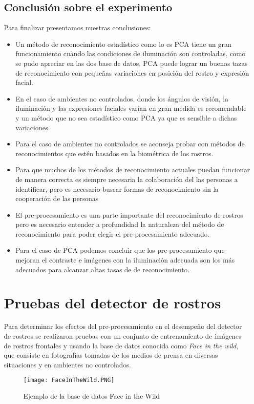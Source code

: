 \subsection{Conclusión sobre el experimento}
Para finalizar presentamos nuestras conclusiones:
\begin{itemize}
\item Un método de reconocimiento estadístico como lo es \ac{PCA} tiene un gran funcionamiento cuando las condiciones de iluminación son controladas, como se pudo apreciar en las dos base de datos, \ac{PCA} puede lograr un buenas tazas de reconocimiento con pequeñas variaciones en posición del rostro y expresión facial.
\item En el caso de ambientes no controlados, donde los ángulos de visión, la iluminación y las expresiones faciales varían en gran medida es recomendable y un método que no sea estadístico como \ac{PCA} ya que es sensible a dichas variaciones.
\item Para el caso de ambientes no controlados se aconseja probar con métodos de reconocimientos que estén basados en la biométrica de los rostros.
\item Para que muchos de los métodos de  reconocimiento actuales  puedan funcionar de manera correcta es siempre necesaria la colaboración del las personas a identificar, pero es necesario buscar formas de reconocimiento sin la cooperación de las personas
\item El pre-procesamiento es una parte importante del reconocimiento de rostros pero es necesario entender a profundidad la naturaleza del método de reconocimiento para poder elegir el pre-procesamiento adecuado.
\item Para el caso de \ac{PCA} podemos concluir que los pre-procesamiento que mejoran el contraste e imágenes con la iluminación adecuada son los más adecuados para alcanzar altas tasas de de reconocimiento.
\end{itemize}

\section{Pruebas del detector de rostros}
Para determinar los efectos del pre-procesamiento en el desempeño del detector de rostros se realizaron pruebas con un conjunto de entrenamiento de imágenes de rostros frontales y usando la base de datos conocida como \textit{Face in the wild}, que consiste en fotografías tomadas de los medios de prensa en diversas situaciones y en ambientes no controlados.
\begin{figure}[h]
    \center
    \texttt{[image: FaceInTheWild.PNG]}
    \caption{Ejemplo de la base de datos Face in the Wild}
\end{figure}

